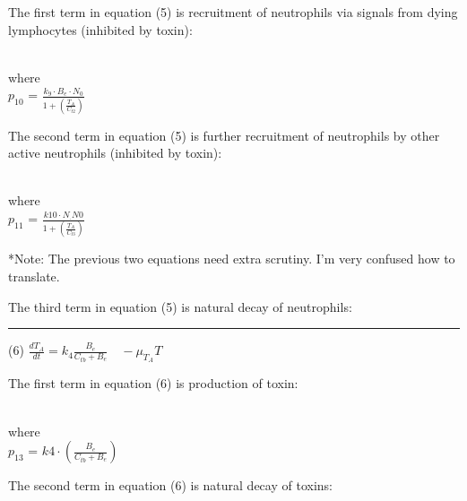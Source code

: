\documentclass{article}
\begin{document}
The first term in equation (5) is recruitment of neutrophils via signals from dying lymphocytes (inhibited by toxin):

\begin{center}
    \\
    where\\
    $p_{10}$ = $\frac{k_9 \cdot B_e \cdot N_0}{1 + (\frac{T_A}{C_{t2}})}$
\end{center}

The second term in equation (5) is further recruitment of neutrophils by other active neutrophils (inhibited by toxin):

\begin{center}
    \\
    where\\
    $p_{11}$ = $\frac{k10 \cdot N_ \cdot N0}{1 + (\frac{T_A}{C_{t3}})}$
\end{center}

*Note: The previous two equations need extra scrutiny. I'm very confused how to translate.

The third term in equation (5) is natural decay of neutrophils:

\begin{center}
\end{center}

\hrule

\begin{center}
        (6) $\displaystyle \frac{dT_A}{dt} = k_4\frac{B_e}{C_{tb} + B_e}\quad - \mu_{T_A} T $
\end{center}

The first term in equation (6) is production of toxin:

\begin{center}
     \\
    where\\
    $p_{13}$ = $k4 \cdot (\frac{B_e}{C_{tb} + B_e})$
\end{center}

The second term in equation (6) is natural decay of toxins:

\begin{center}
\end{center}

\newpage
\end{document}
